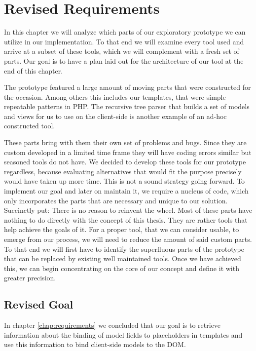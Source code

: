 \documentclass[thesis.tex]{subfiles}
\begin{document}
\chapter{Revised Requirements}
\label{chap:revised}
In this chapter we will analyze which parts of our exploratory prototype we can
utilize in our implementation. To that end we will examine every tool used and
arrive at a subset of these tools, which we will complement with a fresh set of
parts. Our goal is to have a plan laid out for the architecture of our tool
at the end of this chapter.

The prototype featured a large amount of moving parts that were constructed for
the occasion. Among others this includes our templates, that were simple
repeatable patterns in PHP.
The recursive tree parser that builds a set of models and views for us to use
on the client-side is another example of an ad-hoc constructed tool.

These parts bring with them their own set of problems and bugs.
Since they are custom developed in a limited time frame they will have coding
errors similar but seasoned tools do not have.
We decided to develop these tools for our prototype regardless,
because evaluating alternatives that would fit the purpose precisely
would have taken up more time.
This is not a sound strategy going forward. To implement our goal and later on
maintain it, we require a nucleus of code, which only incorporates the parts
that are necessary and unique to our solution.
Succinctly put: There is no reason to reinvent the wheel.
Most of these parts have nothing to do directly with the concept of this thesis.
They are rather tools that help achieve the goals of it.
For a proper tool, that we can consider usable, to emerge from our process,
we will need to reduce the amount of said custom parts.
To that end we will first have to identify the superfluous parts of the
prototype that can be replaced by existing well maintained tools. Once we have
achieved this, we can begin concentrating on the core of our concept and define
it with greater precision.

\section{Revised Goal}
\label{sec:revised-goal}
In chapter \ref{chap:requirements} we concluded that our goal is to retrieve
information about the binding of model fields to placeholders in templates and
use this information to bind client-side models to the DOM.
\end{document}
